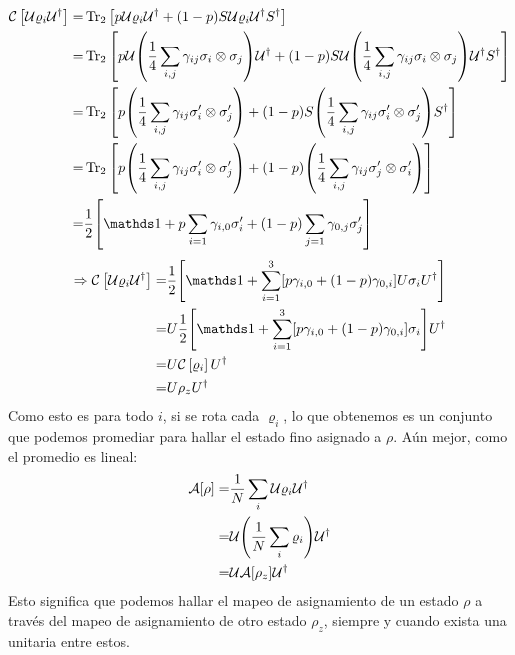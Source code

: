 \begin{align*}
\CG{\mcU \varrho_{i} \mcU^{\dag}}=&\Tr_{2}\qty[p\mcU\varrho_{i}\mcU^{\dag}+(1-p)S\mcU \varrho_{i} \mcU^{\dag}S^{\dag}]\\
=&\Tr_{2}\qty[p\mcU\qty(\frac{1}{4}\sum_{i,j}\gamma_{ij} \sigma_i\otimes\sigma_j)\mcU^{\dag}+(1-p) S\mcU \qty(\frac{1}{4}\sum_{i,j}\gamma_{ij} \sigma_i\otimes\sigma_j) \mcU^{\dag} S^{\dag}]\\
=&\Tr_{2}\qty[p\qty(\frac{1}{4}\sum_{i,j}\gamma_{ij} \sigma_{i}'\otimes\sigma_{j}')+(1-p)S \qty(\frac{1}{4}\sum_{i,j}\gamma_{ij} \sigma_{i}'\otimes\sigma_{j}')S^{\dag}]\\
=&\Tr_{2}\qty[p\qty(\frac{1}{4}\sum_{i,j}\gamma_{ij} \sigma_{i}'\otimes\sigma_{j}')+(1-p)\qty(\frac{1}{4}\sum_{i,j}\gamma_{ij} \sigma_{j}'\otimes\sigma_{i}')]\\
=&\frac{1}{2}\qty[\Id +p\sum_{i=1}\gamma_{i,0}\sigma_{i}'+(1-p)\sum_{j=1}\gamma_{0,j}\sigma_{j}']\\
\end{align*}
\begin{align*}
\Rightarrow\CG{\mcU \varrho_{i} \mcU^{\dag}}
=&\frac{1}{2}\qty[\Id + \sum_{i=1}^3[p\gamma_{i,0}+(1-p)\gamma_{0,i}]U\sigma_{i}U^{\dag}]\\
=&U\frac{1}{2}\qty[\Id + \sum_{i=1}^3[p\gamma_{i,0}+(1-p)\gamma_{0,i}]\sigma_{i}]U^{\dag}\\
=&U\CG{\varrho_{i}}U^{\dag}\\
=&U\rho_{z}U^{\dag}\\
\end{align*}
Como esto es para todo $i$, si se rota cada $\varrho_{i}$, lo que obtenemos es un conjunto que podemos promediar para hallar el estado fino asignado a $\rho$. Aún mejor, como el promedio es lineal:
\begin{align}
\mathcal{A}[\rho]=&\frac{1}{N}\sum_{i}\mathcal{U}\varrho_{i}\mathcal{U}^{\dag}\\
=&\mathcal{U}\qty(\frac{1}{N}\sum_{i}\varrho_{i})\mathcal{U}^{\dag}\\
=&\mathcal{U}\mathcal{A}[\rho_{z}]\mathcal{U}^{\dag}
\end{align}
Esto significa que podemos hallar el mapeo de asignamiento de un estado $\rho$ a través del mapeo de asignamiento de otro estado $\rho_{z}$, siempre y cuando exista una unitaria entre estos.
